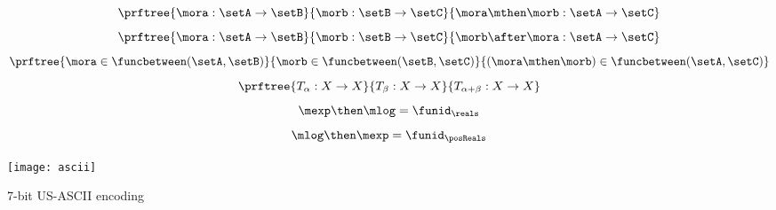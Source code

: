 {\begin{forslides}
    \begin{equation}
      \label{eq:funccomp1}
      \prftree{\mora : \setA \to \setB}{\morb : \setB \to \setC}{\mora \mthen \morb : \setA \to \setC}
    \end{equation}
    \begin{equation}
      \label{eq:funccomp2}
      \prftree{\mora : \setA \to \setB}{\morb : \setB \to \setC}{\morb \after \mora : \setA \to \setC}
    \end{equation}
    \begin{equation}
      \label{eq:funccomp3}
      \prftree{%
        \mora \in \funcbetween(\setA, \setB)}{%
        \morb \in \funcbetween( \setB, \setC)}{
        (\mora \mthen \morb) \in \funcbetween( \setA, \setC)}
    \end{equation}
    \begin{equation}
      \label{eq:transitions}
      \prftree{T_\alpha: X \to X }{T_\beta : X \to X}{T_{\alpha+\beta} : X \to X}
    \end{equation}
    \begin{equation}
      \label{eq:explogid}
      \mexp \then \mlog = \funid_{\reals}
    \end{equation}
    \begin{equation}
      \label{eq:logexpid}
      \mlog \then \mexp = \funid_{\posReals}
    \end{equation}
  \end{forslides}
}%

\begin{marginfigure}
  \texttt{[image: ascii]}
  \caption{7-bit US-ASCII encoding }
  \label{fig:ascii}
\end{marginfigure}

